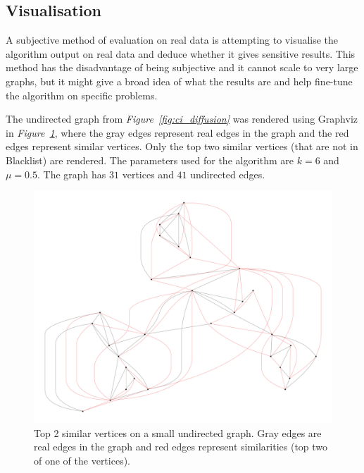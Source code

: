 \documentclass[12pt]{report}
\begin{document}
%
\subsection{Visualisation}
%
A subjective method of evaluation on real data is attempting to visualise the
algorithm output on real data and deduce whether it gives sensitive results.
This method has the disadvantage of being subjective and it cannot scale to very
large graphs, but it might give a broad idea of what the results are and help
fine-tune the algorithm on specific problems.

The undirected graph from \emph{Figure~\ref{fig:ci_diffusion}} was rendered
using Graphviz in \emph{Figure~\ref{fig:visual_first}}, where the gray edges
represent real edges in the graph and the red edges represent similar vertices.
Only the top two similar vertices (that are not in Blacklist) are rendered. The
parameters used for the algorithm are $k=6$ and $\mu=0.5$. The graph has $31$
vertices and $41$ undirected edges.

\begin{figure}[tbp]
  \includegraphics[width=\textwidth]{visual_first}
  \caption{Top 2 similar vertices on a small undirected graph. Gray edges are
  real edges in the graph and red edges represent similarities (top two of one
  of the vertices).}
  \label{fig:visual_first}
\end{figure}


%
%
\end{document}
